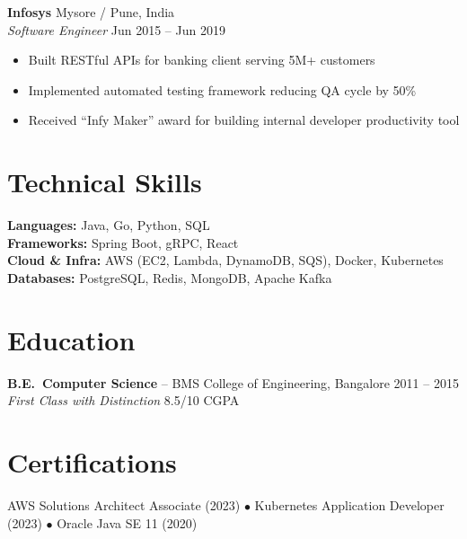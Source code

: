 \documentclass[11pt,letterpaper]{article}
\begin{document}
\textbf{Infosys} \hfill Mysore / Pune, India\\
\textit{Software Engineer} \hfill Jun 2015 -- Jun 2019
\begin{itemize}
\item Built RESTful APIs for banking client serving 5M+ customers
\item Implemented automated testing framework reducing QA cycle by 50\%
\item Received ``Infy Maker'' award for building internal developer productivity tool
\end{itemize}

\section{Technical Skills}
\textbf{Languages:} Java, Go, Python, SQL\\
\textbf{Frameworks:} Spring Boot, gRPC, React\\
\textbf{Cloud \& Infra:} AWS (EC2, Lambda, DynamoDB, SQS), Docker, Kubernetes\\
\textbf{Databases:} PostgreSQL, Redis, MongoDB, Apache Kafka

\section{Education}
\textbf{B.E.\ Computer Science} -- BMS College of Engineering, Bangalore \hfill 2011 -- 2015\\
\textit{First Class with Distinction} \hfill 8.5/10 CGPA

\section{Certifications}
AWS Solutions Architect Associate (2023) \quad $\bullet$ \quad Kubernetes Application Developer (2023) \quad $\bullet$ \quad Oracle Java SE 11 (2020)
\end{document}
